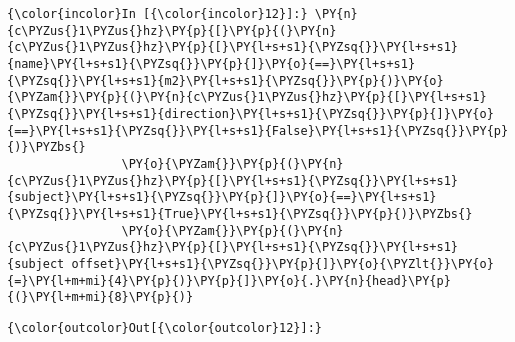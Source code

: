     \begin{Verbatim}[commandchars=\\\{\}]
{\color{incolor}In [{\color{incolor}12}]:} \PY{n}{c\PYZus{}1\PYZus{}hz}\PY{p}{[}\PY{p}{(}\PY{n}{c\PYZus{}1\PYZus{}hz}\PY{p}{[}\PY{l+s+s1}{\PYZsq{}}\PY{l+s+s1}{name}\PY{l+s+s1}{\PYZsq{}}\PY{p}{]}\PY{o}{==}\PY{l+s+s1}{\PYZsq{}}\PY{l+s+s1}{m2}\PY{l+s+s1}{\PYZsq{}}\PY{p}{)}\PY{o}{\PYZam{}}\PY{p}{(}\PY{n}{c\PYZus{}1\PYZus{}hz}\PY{p}{[}\PY{l+s+s1}{\PYZsq{}}\PY{l+s+s1}{direction}\PY{l+s+s1}{\PYZsq{}}\PY{p}{]}\PY{o}{==}\PY{l+s+s1}{\PYZsq{}}\PY{l+s+s1}{False}\PY{l+s+s1}{\PYZsq{}}\PY{p}{)}\PYZbs{}
                \PY{o}{\PYZam{}}\PY{p}{(}\PY{n}{c\PYZus{}1\PYZus{}hz}\PY{p}{[}\PY{l+s+s1}{\PYZsq{}}\PY{l+s+s1}{subject}\PY{l+s+s1}{\PYZsq{}}\PY{p}{]}\PY{o}{==}\PY{l+s+s1}{\PYZsq{}}\PY{l+s+s1}{True}\PY{l+s+s1}{\PYZsq{}}\PY{p}{)}\PYZbs{}
                \PY{o}{\PYZam{}}\PY{p}{(}\PY{n}{c\PYZus{}1\PYZus{}hz}\PY{p}{[}\PY{l+s+s1}{\PYZsq{}}\PY{l+s+s1}{subject offset}\PY{l+s+s1}{\PYZsq{}}\PY{p}{]}\PY{o}{\PYZlt{}}\PY{o}{=}\PY{l+m+mi}{4}\PY{p}{)}\PY{p}{]}\PY{o}{.}\PY{n}{head}\PY{p}{(}\PY{l+m+mi}{8}\PY{p}{)}
\end{Verbatim}
\begin{Verbatim}[commandchars=\\\{\}]
{\color{outcolor}Out[{\color{outcolor}12}]:} 
\end{Verbatim}
